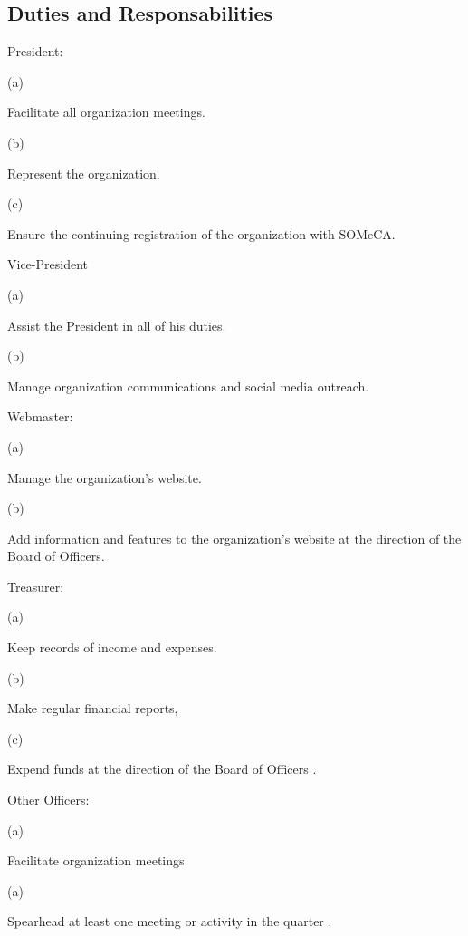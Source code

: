 \documentclass{article}
\newcommand{\SubItem}[1]{
    {\setlength\itemindent{15pt} \item[] #1}
}
\begin{document}
\subsection{Duties and Responsabilities}
\begin{itemize}
    \item[1.] President:
        \SubItem{(a)} Facilitate all organization meetings.
        \SubItem{(b)} Represent the organization.
        \SubItem{(c)} Ensure the continuing registration of the organization with SOMeCA.
    \item[] %
    \item[2.] Vice-President
        \SubItem{(a)} Assist the President in all of his duties.
        \SubItem{(b)} Manage organization communications and social media outreach.
    \item[] %
    \item[3.] Webmaster:
        \SubItem{(a)} Manage the organization's website. 
        \SubItem{(b)} Add information and features to the organization's website at the 
        direction of the Board of Officers.
    \item[] %
    \item[4.] Treasurer: 
        \SubItem{(a)} Keep records of income and expenses. 
        \SubItem{(b)} Make regular financial reports, 
        \SubItem{(c)} Expend funds at the direction of the Board of Officers .
    \item[] %
    \item[5.] Other Officers:
        \SubItem{(a)} Facilitate organization meetings 
        \SubItem{(a)} Spearhead at least one meeting or activity in the quarter .
\end{itemize}
\end{document}
